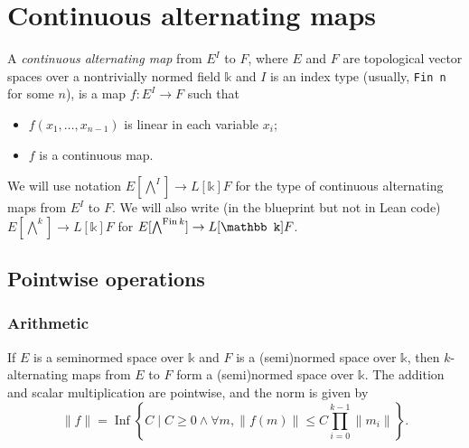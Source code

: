 \chapter{Continuous alternating maps}

\begin{definition}%
  \label{def:cont-alt-map}
  \leanok%
  A \emph{continuous alternating map} from \(E^{I}\) to \(F\),
  where \(E\) and \(F\) are topological vector spaces
  over a nontrivially normed field \(\mathbb k\)
  and \(I\) is an index type (usually, \texttt{Fin n} for some \(n\)),
  is a map \(f\colon E^{I} \to F\) such that
  \begin{itemize}
  \item \(f(x_{1}, \dots, x_{n - 1})\) is linear in each variable \(x_{i}\);
  \item \(f\) is a continuous map.
  \end{itemize}
\end{definition}

We will use notation \(E [\bigwedge^{I}]\to L[\mathbb k] F\)
for the type of continuous alternating maps from \(E^{I}\) to \(F\).
We will also write (in the blueprint but not in Lean code)
\(E [\bigwedge^{k}]\to L[\mathbb k] F\) for \(E [\bigwedge^{\Fin k}]\to L[\mathbb k] F\).

\section{Pointwise operations}%
\label{sec:pointwise-operations}

\subsection{Arithmetic}%
\label{sec:arithmetic}

\begin{theorem}%
  \label{thm:normed-grp}
  If \(E\) is a seminormed space over \(\mathbb k\) and \(F\) is a (semi)normed space over \(\mathbb k\),
  then \(k\)-alternating maps from \(E\) to \(F\) form a (semi)normed space over \(\mathbb k\).
  The addition and scalar multiplication are pointwise, and the norm is given by
  \begin{equation}
    \label{eq:alt-norm}
    \|f\| = \operatorname{Inf} \left\{C \mid C \ge 0 \wedge \forall m, \|f(m)\| \le C\prod_{i=0}^{k-1}\|m_{i}\|\right\}.
  \end{equation}
\end{theorem}

